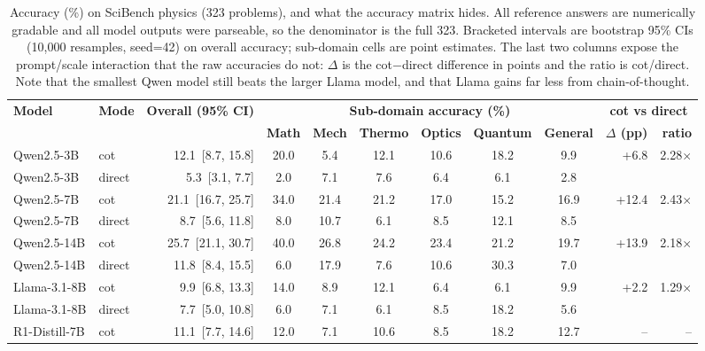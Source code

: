 \begin{table}[t]
  \centering
  \caption{Accuracy (\%) on SciBench physics (323 problems), and what the accuracy
           matrix hides. All reference answers are numerically gradable and all model
           outputs were parseable, so the denominator is the full 323. Bracketed intervals
           are bootstrap 95\% CIs (10{,}000 resamples, seed=42) on overall accuracy;
           sub-domain cells are point estimates. The last two columns expose the
           prompt/scale interaction that the raw accuracies do not: $\Delta$ is the
           cot$-$direct difference in points and the ratio is cot/direct. Note that the
           smallest Qwen model still beats the larger Llama model, and that Llama gains
           far less from chain-of-thought.}
  \label{tab:main}
  \footnotesize
  \setlength{\tabcolsep}{4pt}
  \begin{tabular}{@{}l l r c c c c c c | r r@{}}
    \toprule
    \multirow{2}{*}{\textbf{Model}} & \multirow{2}{*}{\textbf{Mode}} &
      \multirow{2}{*}{\textbf{Overall (95\% CI)}} &
      \multicolumn{6}{c|}{\textbf{Sub-domain accuracy (\%)}} &
      \multicolumn{2}{c}{\textbf{cot vs direct}} \\
    \cmidrule(lr){4-9}\cmidrule(lr){10-11}
    & & & \textbf{Math} & \textbf{Mech} & \textbf{Thermo} & \textbf{Optics} & \textbf{Quantum} & \textbf{General} & \textbf{$\Delta$ (pp)} & \textbf{ratio} \\
    \midrule
    Qwen2.5-3B & cot & 12.1 \,[8.7, 15.8] & 20.0 & 5.4 & 12.1 & 10.6 & 18.2 & 9.9 & +6.8 & 2.28$\times$ \\
    Qwen2.5-3B & direct & 5.3 \,[3.1, 7.7] & 2.0 & 7.1 & 7.6 & 6.4 & 6.1 & 2.8 & &  \\
    \addlinespace[2pt]
    Qwen2.5-7B & cot & 21.1 \,[16.7, 25.7] & 34.0 & 21.4 & 21.2 & 17.0 & 15.2 & 16.9 & +12.4 & 2.43$\times$ \\
    Qwen2.5-7B & direct & 8.7 \,[5.6, 11.8] & 8.0 & 10.7 & 6.1 & 8.5 & 12.1 & 8.5 & &  \\
    \addlinespace[2pt]
    Qwen2.5-14B & cot & 25.7 \,[21.1, 30.7] & 40.0 & 26.8 & 24.2 & 23.4 & 21.2 & 19.7 & +13.9 & 2.18$\times$ \\
    Qwen2.5-14B & direct & 11.8 \,[8.4, 15.5] & 6.0 & 17.9 & 7.6 & 10.6 & 30.3 & 7.0 & &  \\
    \addlinespace[2pt]
    Llama-3.1-8B & cot & 9.9 \,[6.8, 13.3] & 14.0 & 8.9 & 12.1 & 6.4 & 6.1 & 9.9 & +2.2 & 1.29$\times$ \\
    Llama-3.1-8B & direct & 7.7 \,[5.0, 10.8] & 6.0 & 7.1 & 6.1 & 8.5 & 18.2 & 5.6 & &  \\
    \addlinespace[2pt]
    R1-Distill-7B & cot & 11.1 \,[7.7, 14.6] & 12.0 & 7.1 & 10.6 & 8.5 & 18.2 & 12.7 & -- & -- \\
    \bottomrule
  \end{tabular}
\end{table}
